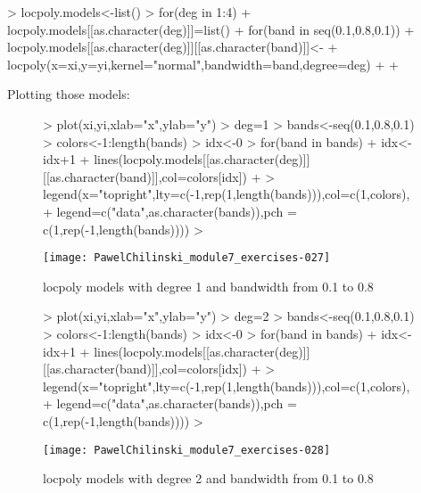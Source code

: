 \documentclass[a4paper]{article}
\begin{document}
\begin{Schunk}
\begin{Sinput}
> locpoly.models<-list()
> for(deg in 1:4){
+ 	locpoly.models[[as.character(deg)]]=list()
+ 	for(band in seq(0.1,0.8,0.1)){
+ 		locpoly.models[[as.character(deg)]][[as.character(band)]]<-
+ 				locpoly(x=xi,y=yi,kernel="normal",bandwidth=band,degree=deg)		
+ 	}
+ }
\end{Sinput}
\end{Schunk}
Plotting those models:
\begin{figure}[H]
\begin{center}
\begin{Schunk}
\begin{Sinput}
> plot(xi,yi,xlab="x",ylab="y")
> deg=1
> bands<-seq(0.1,0.8,0.1)
> colors<-1:length(bands)
> idx<-0
> for(band in bands){
+ 	idx<-idx+1
+ 	lines(locpoly.models[[as.character(deg)]][[as.character(band)]],col=colors[idx])		
+ }
> legend(x="topright",lty=c(-1,rep(1,length(bands))),col=c(1,colors), 
+ 		legend=c("data",as.character(bands)),pch = c(1,rep(-1,length(bands))))
> 
\end{Sinput}
\end{Schunk}
\texttt{[image: PawelChilinski\_module7\_exercises-027]}
\caption{locpoly models with degree 1 and bandwidth from 0.1 to 0.8}
\end{center}
\end{figure}

\begin{figure}[H]
\begin{center}
\begin{Schunk}
\begin{Sinput}
> plot(xi,yi,xlab="x",ylab="y")
> deg=2
> bands<-seq(0.1,0.8,0.1)
> colors<-1:length(bands)
> idx<-0
> for(band in bands){
+ 	idx<-idx+1
+ 	lines(locpoly.models[[as.character(deg)]][[as.character(band)]],col=colors[idx])		
+ }
> legend(x="topright",lty=c(-1,rep(1,length(bands))),col=c(1,colors), 
+ 		legend=c("data",as.character(bands)),pch = c(1,rep(-1,length(bands))))
> 
\end{Sinput}
\end{Schunk}
\texttt{[image: PawelChilinski\_module7\_exercises-028]}
\caption{locpoly models with degree 2 and bandwidth from 0.1 to 0.8}
\end{center}
\end{figure}
\end{document}
